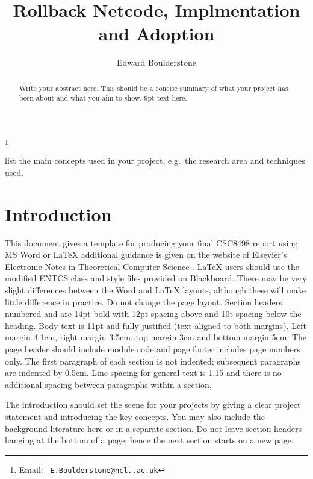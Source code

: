 \documentclass{entcs}
\begin{document}
\begin{frontmatter}
\title{Rollback Netcode, Implmentation and Adoption}
\author{Edward Boulderstone}
  \address{School of Computing Science, Newcastle University, UK} 
\thanks[nigellemail]{Email:
    \href{mailto:E.Boulderstone@ncl..ac.uk} {\texttt{\normalshape
        E.Boulderstone@ncl..ac.uk}}}

			
				
\begin{abstract} 
Write your abstract here. This should be a concise summary of what your project has been about and what you aim to show. 9pt text here.
\end{abstract}

\begin{keyword}
list the main concepts used in your project, e.g.\ the research area and techniques used.
\end{keyword}
\end{frontmatter}

\section{Introduction}\label{sec: introduction}

This document gives a template for producing your final CSC8498 report using MS Word or LaTeX \cite{thomas2016} additional guidance is given on the website of Elsevier’s Electronic Notes in Theoretical Computer Science \cite{entcs}. LaTeX users should use the modified ENTCS class and style files provided on Blackboard. There may be very slight differences between the Word and LaTeX layouts, although these will make little difference in practice. Do not change the page layout. Section headers numbered and are 14pt bold with 12pt spacing above and 10t spacing below the heading. Body text is 11pt and fully justified (text aligned to both margins). Left margin 4.1cm, right margin 3.5cm, top margin 3cm and bottom margin 5cm. The page header should include module code and page footer includes page numbers only. The first paragraph of each section is not indented; subsequent paragraphs are indented by 0.5cm. Line spacing for general text is 1.15 and there is no additional spacing between paragraphs within a section. 

The introduction should set the scene for your projects by giving a clear project statement and introducing the key concepts. You may also include the background literature here or in a separate section. Do not leave section headers hanging at the bottom of a page; hence the next section starts on a new page.
\end{document}
